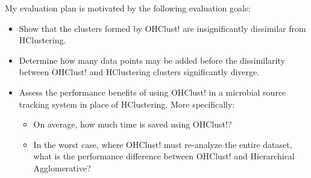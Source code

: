 \documentclass[12pt]{ucthesis}
\begin{document}
      My evaluation plan is motivated by the following evaluation goals:
      \begin{itemize}
         \item Show that the clusters formed by OHClust! are insignificantly
               dissimilar from HClustering.
         \item Determine how many data points may be added before the
               dissimilarity between OHClust! and HClustering clusters
               significantly diverge.
         \item Assess the performance benefits of using OHClust! in a
               microbial source tracking system in place of HClustering. More
               specifically:
               \begin{itemize}
                  \item On average, how much time is saved using OHClust!?
                  \item In the worst case, where OHClust! must re-analyze the
                        entire dataset, what is the performance difference
                        between OHClust! and Hierarchical Agglomerative?
               \end{itemize}
      \end{itemize}
\end{document}
